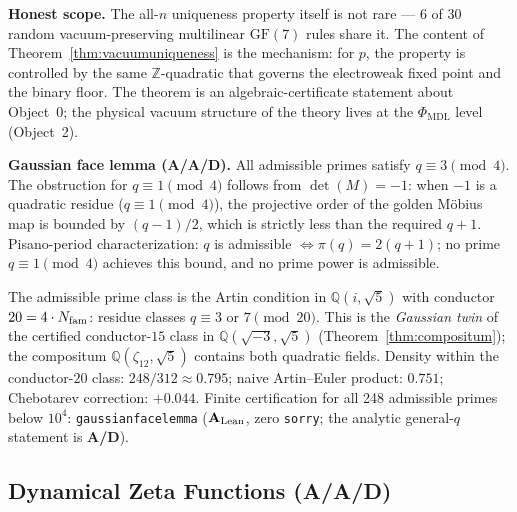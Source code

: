 \documentclass[11pt]{article}
\theoremstyle{remark}
\newcommand{\PHIMDL}{\ensuremath{\Phi_{\mathrm{MDL}}}}
\newcommand{\GF}[1]{\ensuremath{\mathrm{GF}(#1)}}
\newcommand{\lean}[1]{%
  \penalty-100
  \begingroup\def\_{\textunderscore\allowbreak}\texttt{#1}\endgroup}
\newcommand{\CatA}{\textbf{A}}
\newcommand{\CatAL}{\texorpdfstring{\ensuremath{\textbf{A}_{\rm Lean}}}{A-Lean}}
\newcommand{\CatAD}{\textbf{A/D}}
\begin{document}
\medskip
\noindent\textbf{Honest scope.} The all-$n$ uniqueness property itself is
not rare --- 6 of 30 random vacuum-preserving multilinear $\GF{7}$ rules
share it. The content of Theorem~\ref{thm:vacuumuniqueness} is the
mechanism: for $p$, the property is controlled by the same
$\mathbb{Z}$-quadratic that governs the electroweak fixed point and the
binary floor. The theorem is an algebraic-certificate statement about
Object~0; the physical vacuum structure of the theory lives at the
$\PHIMDL{}$ level (Object~2).

\medskip
\noindent\textbf{Gaussian face lemma (\CatA{}/\CatAD{}).}
All admissible primes satisfy $q \equiv 3 \pmod{4}$.  The obstruction for
$q \equiv 1 \pmod{4}$ follows from $\det(M) = -1$: when $-1$ is a quadratic
residue ($q \equiv 1 \pmod{4}$), the projective order of the golden M\"{o}bius
map is bounded by $(q-1)/2$, which is strictly less than the required $q+1$.
Pisano-period characterization: $q$ is admissible $\iff \pi(q) = 2(q+1)$;
no prime $q \equiv 1 \pmod{4}$ achieves this bound, and no prime power is
admissible.

The admissible prime class is the Artin condition in $\mathbb{Q}(i,\sqrt{5})$
with conductor $20 = 4 \cdot N_{\rm fam}$: residue classes $q \equiv 3$
or $7 \pmod{20}$.  This is the \emph{Gaussian twin} of the certified
conductor-$15$ class in $\mathbb{Q}(\sqrt{-3},\sqrt{5})$
(Theorem~\ref{thm:compositum}); the compositum $\mathbb{Q}(\zeta_{12},\sqrt{5})$
contains both quadratic fields.  Density within the conductor-$20$ class:
$248/312 \approx 0.795$; naive Artin--Euler product: $0.751$; Chebotarev
correction: $+0.044$.  Finite certification for all 248 admissible primes below
$10^4$: \lean{gaussian\_face\_lemma} (\CatAL{}, zero \texttt{sorry}; the
analytic general-$q$ statement is \CatAD{}).

\subsection{Dynamical Zeta Functions (\CatA{}/\CatAD{})}
\label{subsec:dynamical-zeta}
\end{document}
